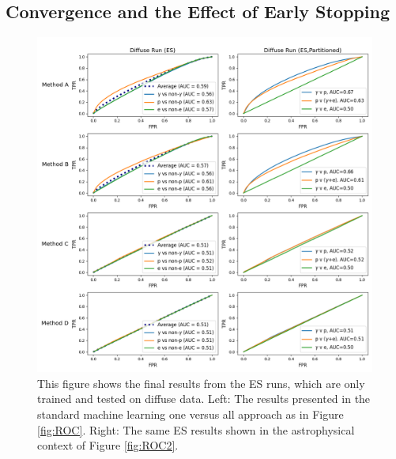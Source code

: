 \subsection{Convergence and the Effect of Early Stopping}
\begin{figure}
  \centering
  \includegraphics[width=\textwidth]{figures/esplot.png}
  \caption{This figure shows the final results from the ES runs, which are only trained and tested on diffuse data. Left: The results presented in the standard machine learning one versus all approach as in Figure \ref{fig:ROC}. Right: The same ES results shown in the astrophysical context of Figure \ref{fig:ROC2}.
  }
  \label{fig:ROC3}
\end{figure}

